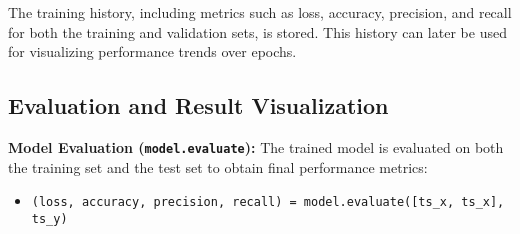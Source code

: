 \documentclass[twocolumn]{article}
\begin{document}
\vspace{0.5em}
The training history, including metrics such as loss, accuracy, precision, and recall for both the training and validation sets, is stored. This history can later be used for visualizing performance trends over epochs.

\subsection{Evaluation and Result Visualization}

\vspace{0.5em}
\textbf{Model Evaluation (\texttt{model.evaluate}):}
The trained model is evaluated on both the training set and the test set to obtain final performance metrics:
\begin{itemize}
    \item \texttt{(loss, accuracy, precision, recall) = model.evaluate([ts\_x, ts\_x], ts\_y)}
\end{itemize}
\end{document}
